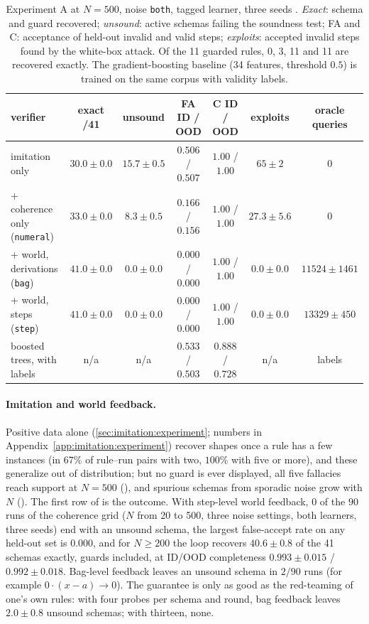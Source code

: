 \begin{table}[ht]
\centering\footnotesize
\setlength{\tabcolsep}{3pt}
\begin{tabular}{@{}lcccccc@{}}
\toprule
verifier & exact /41 & unsound & FA ID / OOD & C ID / OOD & exploits & oracle queries\\
\midrule
imitation only & $30.0\pm0.0$ & $15.7\pm0.5$ & $0.506$ / $0.507$ & $1.00$ / $1.00$ & $65\pm2$ & 0\\
+ coherence only (\texttt{numeral}) & $33.0\pm0.0$ & $8.3\pm0.5$ & $0.166$ / $0.156$ & $1.00$ / $1.00$ & $27.3\pm5.6$ & 0\\
+ world, derivations (\texttt{bag}) & $41.0\pm0.0$ & $0.0\pm0.0$ & $0.000$ / $0.000$ & $1.00$ / $1.00$ & $0.0\pm0.0$ & $11524\pm1461$\\
+ world, steps (\texttt{step}) & $41.0\pm0.0$ & $0.0\pm0.0$ & $0.000$ / $0.000$ & $1.00$ / $1.00$ & $0.0\pm0.0$ & $13329\pm450$\\
\addlinespace
boosted trees, with labels & n/a & n/a & $0.533$ / $0.503$ & $0.888$ / $0.728$ & n/a & labels\\
\bottomrule
\end{tabular}
\caption{Experiment A at $N=500$, noise \texttt{both}, tagged learner, three seeds . \emph{Exact}: schema and guard recovered; \emph{unsound}: active schemas failing the soundness test; FA and C: acceptance of held-out invalid and valid steps; \emph{exploits}: accepted invalid steps found by the white-box attack. Of the 11 guarded rules, 0, 3, 11 and 11 are recovered exactly. The gradient-boosting baseline (34 features, threshold $0.5$) is trained on the same corpus with validity labels.}
\label{tab:experiments:algebra}
\end{table}

\paragraph{Imitation and world feedback.} Positive data alone (\cref{sec:imitation:experiment}; numbers in Appendix~\ref{app:imitation:experiment}) recover shapes once a rule has a few instances (in $67\%$ of rule--run pairs with two, $100\%$ with five or more), and these generalize out of distribution; but no guard is ever displayed, all five fallacies reach support at $N=500$ (), and spurious schemas from sporadic noise grow with $N$ (). The first row of  is the outcome. With step-level world feedback, $0$ of the $90$ runs of the coherence grid ($N$ from 20 to 500, three noise settings, both learners, three seeds) end with an unsound schema, the largest false-accept rate on any held-out set is $0.000$, and for $N\ge200$ the loop recovers $40.6\pm0.8$ of the 41 schemas exactly, guards included, at ID/OOD completeness $0.993\pm0.015$ / $0.992\pm0.018$. Bag-level feedback leaves an unsound schema in $2/90$ runs (for example $0\cdot(x-a)\to0$). The guarantee is only as good as the red-teaming of one's own rules: with four probes per schema and round, bag feedback leaves $2.0\pm0.8$ unsound schemas; with thirteen, none.

